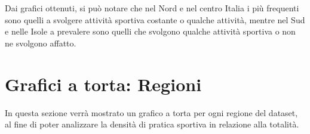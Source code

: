 \begin{figure}[!htbp]
    \centering
        \qquad
        \qquad
\end{figure}

Dai grafici ottenuti, si può notare che nel Nord e nel centro Italia i più frequenti sono quelli a svolgere attività sportiva costante o qualche attività, mentre nel Sud e nelle Isole a prevalere sono quelli che svolgono qualche attività sportiva o non ne svolgono affatto.



\section{Grafici a torta: Regioni}\label{cap2.3}

In questa sezione verrà mostrato un grafico a torta per ogni regione del dataset, al fine di poter analizzare la densità di pratica sportiva in relazione alla totalità.


